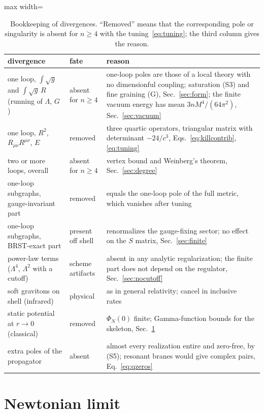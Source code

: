 \documentclass[a4paper,11pt]{article}
\begin{document}
\begin{table}[t]
\centering
\small\begin{adjustbox}{max width=\linewidth}\begin{tabular}{p{4.6cm}p{2.5cm}p{9.6cm}}
divergence & fate & reason\\
\hline
one loop, $\int\sqrt g$ and $\int\sqrt g\,R$ (running of $\Lambda$, $G$) & absent for $n\ge4$ & one-loop poles are those of a local theory with no dimensionful coupling; saturation (S3) and fine graining (G), Sec.~\ref{sec:form}; the finite vacuum energy has mean $3nM^4/(64\pi^2)$, Sec.~\ref{sec:vacuum}\\
one loop, $R^2$, $R_{\mu\nu}R^{\mu\nu}$, $E$ & removed & three quartic operators, triangular matrix with determinant $-24/c^3$, Eqs.~\eqref{eq:killcontrib}, \eqref{eq:tuning}\\
two or more loops, overall & absent for $n\ge4$ & vertex bound and Weinberg's theorem, Sec.~\ref{sec:degree}\\
one-loop subgraphs, gauge-invariant part & removed & equals the one-loop pole of the full metric, which vanishes after tuning\\
one-loop subgraphs, BRST-exact part & present off shell & renormalizes the gauge-fixing sector; no effect on the $S$ matrix, Sec.~\ref{sec:finite}\\
power-law terms ($\Lambda^4$, $\Lambda^2$ with a cutoff) & scheme artifacts & absent in any analytic regularization; the finite part does not depend on the regulator, Sec.~\ref{sec:nocutoff}\\
soft gravitons on shell (infrared) & physical & as in general relativity; cancel in inclusive rates~\cite{Weinberg1965}\\
static potential at $r\to0$ (classical) & removed & $\Phi_N(0)$ finite; Gamma-function bounds for the skeleton, Sec.~\ref{sec:classical}\\
extra poles of the propagator & absent & almost every realization entire and zero-free, by (S5); resonant branes would give complex pairs, Eq.~\eqref{eq:qzeros}\\
\hline\hline
\end{tabular}\end{adjustbox}
\caption{Bookkeeping of divergences. ``Removed'' means that the corresponding pole or singularity is absent for $n\ge4$ with the tuning~\eqref{eq:tuning}; the third column gives the reason.}
\label{tab:divergences}
\end{table}


\section{Newtonian limit}
\label{sec:classical}
\end{document}
